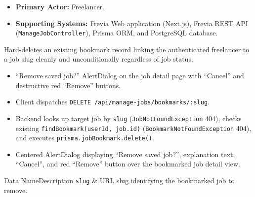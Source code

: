
\begin{itemize}[leftmargin=1.6em,topsep=3pt,itemsep=2pt,parsep=0pt,label=$\bullet$]
    \item \textbf{Primary Actor:} Freelancer.
    \item \textbf{Supporting Systems:} Frevia Web application (Next.js), Frevia REST API (\texttt{ManageJobController}), Prisma ORM, and PostgreSQL database.
\end{itemize}

\noindent Hard-deletes an existing bookmark record linking the authenticated freelancer to a job slug cleanly and unconditionally regardless of job status.

\begin{itemize}[leftmargin=1.6em,topsep=3pt,itemsep=2pt,parsep=0pt,label=$\bullet$]
    \item ``Remove saved job?'' AlertDialog on the job detail page with ``Cancel'' and destructive red ``Remove'' buttons.
\end{itemize}

\begin{itemize}[leftmargin=1.6em,topsep=3pt,itemsep=2pt,parsep=0pt,label=$\bullet$]
    \item Client dispatches \texttt{DELETE /api/manage-jobs/bookmarks/:slug}.
    \item Backend looks up target job by \texttt{slug} (\texttt{JobNotFoundException} 404), checks existing \texttt{findBookmark(userId, job.id)} (\texttt{BookmarkNotFoundException} 404), and executes \texttt{prisma.jobBookmark.delete()}.
\end{itemize}

\begin{itemize}[leftmargin=1.6em,topsep=3pt,itemsep=2pt,parsep=0pt,label=$\bullet$]
    \item Centered AlertDialog displaying ``Remove saved job?'', explanation text, ``Cancel'', and red ``Remove'' button over the bookmarked job detail view.
\end{itemize}


\begin{specdatatable}{Data Name}{Description}
\texttt{slug} & URL slug identifying the bookmarked job to remove.\\ \hline
\end{specdatatable}

